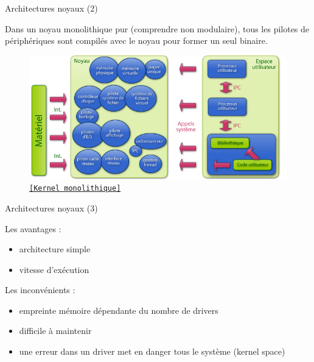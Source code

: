 \documentclass[12pt, t]{beamer}
\newcommand{\bi}{\begin{itemize}}
\newcommand{\ei}{\end{itemize}}
\newcommand{\src}[2]{\vspace{-10pt}\caption{\href{#1}{\centering \tt \tiny [#2]}}}
\begin{document}
\begin{frame}{Architectures noyaux (2)}

    \vspace{10pt}
    Dans un noyau monolithique pur (comprendre non modulaire), tous les pilotes
    de périphériques sont compilés avec le noyau pour former un seul binaire.

    {
        \vspace{5pt}
        \begin{figure}
            \centering
            \includegraphics[scale=0.44]{mono.png}
            \src{https://fr.wikipedia.org/wiki/Noyau\_de\_syst\%C3\%A8me\_d\%27exploitation}{Kernel monolithique}
        \end{figure}
    }

\end{frame}

\begin{frame}{Architectures noyaux (3)}

    \vspace{10pt}
    Les avantages :
    \vspace{5pt}
    \bi
    \itemsep8pt
    \item architecture simple
    \item vitesse d'exécution
    \ei

    {
        \vspace{10pt}
        Les inconvénients :
        \vspace{5pt}
        \bi
        \itemsep8pt
        \item empreinte mémoire dépendante du nombre de drivers
        \item difficile à maintenir
        \item une erreur dans un driver met en danger tous le système (kernel
              space)
        \ei
    }

\end{frame}
\end{document}
